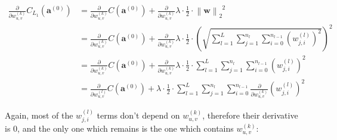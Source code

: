 \documentclass[titlepage]{article}
\begin{document}
            \begin{equation}
              \begin{split}
                \frac{\partial}{\partial w_{u,v}^{(k)}}
                  C_{L_1} \left( \mathbf{a}^{(0)} \right)
                    & = \frac{\partial}{\partial w_{u,v}^{(k)}}
                          C \left( \mathbf{a}^{(0)} \right)
                        +
                        \frac{\partial}{\partial w_{u,v}^{(k)}}
                          \lambda
                          \cdot
                          \frac{1}{2}
                          \cdot
                          \left\| \mathbf{w} \right\|_2^{\enspace 2}  \\
                    & = \frac{\partial}{\partial w_{u,v}^{(k)}}
                          C \left( \mathbf{a}^{(0)} \right)
                        +
                        \frac{\partial}{\partial w_{u,v}^{(k)}}
                          \lambda
                          \cdot
                          \frac{1}{2}
                          \cdot
                          \left(
                            \sqrt{
                              \sum_{l=1}^L \sum_{j=1}^{n_l} \sum_{i=0}^{n_{l-1}}
                                \left( w_{j,i}^{(l)} \right)^2
                            }
                          \right)^2 \\
                    & = \frac{\partial}{\partial w_{u,v}^{(k)}}
                          C \left( \mathbf{a}^{(0)} \right)
                        +
                        \frac{\partial}{\partial w_{u,v}^{(k)}}
                          \lambda
                          \cdot
                          \frac{1}{2}
                          \cdot
                          \sum_{l=1}^L \sum_{j=1}^{n_l} \sum_{i=0}^{n_{l-1}}
                            \left( w_{j,i}^{(l)} \right)^2 \\
                    & = \frac{\partial}{\partial w_{u,v}^{(l)}}
                          C \left( \mathbf{a}^{(0)} \right)
                        +
                        \lambda
                        \cdot
                        \frac{1}{2}
                        \cdot
                        \sum_{l=1}^L \sum_{j=1}^{n_l} \sum_{i=0}^{n_{l-1}}
                          \frac{\partial}{\partial w_{u,v}^{(k)}}
                            \left( w_{j,i}^{(l)} \right)^2
              \end{split}
            \end{equation}

            Again, most of the $w_{j,i}^{(l)}$ terms don't depend on
            $w_{u,v}^{(k)}$, therefore their derivative is $0$, and the only one
            which remains is the one which contains $w_{u,v}^{(k)}$:
\end{document}
